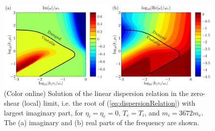 \documentclass[12pt,superscriptaddress]{revtex4}
\begin{document}
\begin{figure}[h!]
\includegraphics[width=6in]{m20141214_01_plotUniversalModeDispersionRelationForPaper.pdf}
\caption{(Color online) Solution of the linear dispersion relation in the zero-shear (local) limit, i.e. the
root of (\ref{eq:dispersionRelation}) with largest imaginary part, for $\eta_i = \eta_e = 0$,
$T_e = T_i$, and $m_i = 3672 m_e$.
The (a) imaginary and (b)
real parts of the frequency are shown.
\label{fig:localDispersionRelation}}
\end{figure}



\end{document}
